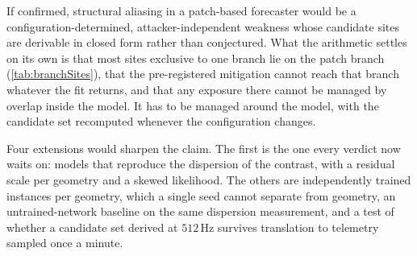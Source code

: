If confirmed, structural aliasing in a patch-based forecaster would be a configuration-determined, attacker-independent weakness whose candidate sites are derivable in closed form rather than conjectured. What the arithmetic settles on its own is that most sites exclusive to one branch lie on the patch branch (\autoref{tab:branchSites}), that the pre-registered mitigation cannot reach that branch whatever the fit returns, and that any exposure there cannot be managed by overlap inside the model. It has to be managed around the model, with the candidate set recomputed whenever the configuration changes.

Four extensions would sharpen the claim. The first is the one every verdict now waits on: models that reproduce the dispersion of the contrast, with a residual scale per geometry and a skewed likelihood. The others are independently trained instances per geometry, which a single seed cannot separate from geometry, an untrained-network baseline on the same dispersion measurement, and a test of whether a candidate set derived at $512$\,Hz survives translation to telemetry sampled once a minute.
